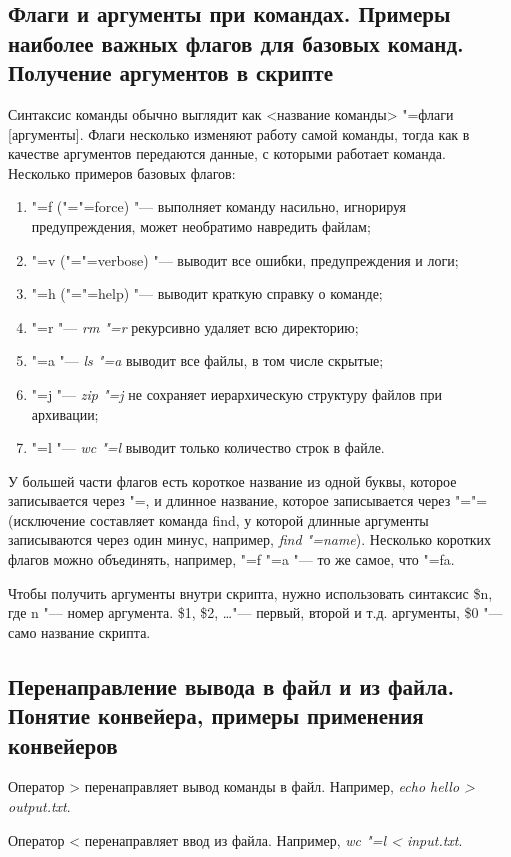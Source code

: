 \documentclass[12pt]{article}
\begin{document}
\subsection{Флаги и аргументы при командах. Примеры наиболее важных флагов для базовых команд. Получение аргументов в скрипте}
Синтаксис команды обычно выглядит как <название команды> "=флаги [аргументы]. Флаги несколько изменяют работу самой команды, тогда как в качестве аргументов передаются данные, с которыми работает команда. Несколько примеров базовых флагов:
\begin{enumerate}
\item "=f ("="=force) "--- выполняет команду насильно, игнорируя предупреждения, может необратимо навредить файлам;
\item "=v ("="=verbose) "--- выводит все ошибки, предупреждения и логи;
\item "=h ("="=help) "--- выводит краткую справку о команде;
\item "=r "--- \textit{rm "=r} рекурсивно удаляет всю директорию;
\item "=a "--- \textit{ls "=a} выводит все файлы, в том числе скрытые;
\item "=j "--- \textit{zip "=j} не сохраняет иерархическую структуру файлов при архивации;
\item "=l "--- \textit{wc "=l} выводит только количество строк в файле.
\end{enumerate}

У большей части флагов есть короткое название из одной буквы, которое записывается через "=, и длинное название, которое записывается через "="= (исключение составляет команда find, у которой длинные аргументы записываются через один минус, например, \textit{find "=name}). Несколько коротких флагов можно объединять, например, "=f "=a "--- то же самое, что "=fa.

Чтобы получить аргументы внутри скрипта, нужно использовать синтаксис \$n, где n "--- номер аргумента. \$1, \$2, \dots "--- первый, второй и т.д. аргументы, \$0 "--- само название скрипта.

\subsection{Перенаправление вывода в файл и из файла. Понятие конвейера, примеры применения конвейеров}
Оператор > перенаправляет вывод команды в файл. Например, \textit{echo \glqq hello \grqq > output.txt}.

Оператор < перенаправляет ввод из файла. Например, \textit{wc "=l < input.txt}.
\end{document}
